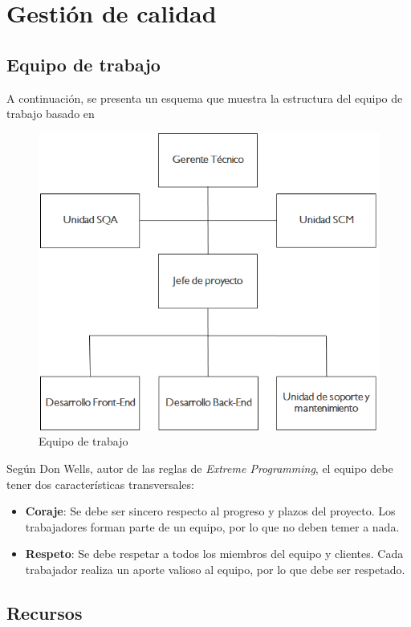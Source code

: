 
\chapter{Gestión de calidad}

\section{Equipo de trabajo}

A continuación, se presenta un esquema que muestra la estructura del equipo de trabajo basado en \citet{web00}\\ 

\begin{figure}[ht!]
\centering
\includegraphics[width=.7\textwidth]{figures/equipo-trabajo.png}
\caption{Equipo de trabajo}
\label{fig:Equipo de trabajo}
\end{figure}

Según Don Wells, autor de las reglas de \textit{Extreme Programming},  el equipo debe tener dos características transversales:

	\begin{itemize}
		\item 
		 \textbf{Coraje}: Se debe ser sincero respecto al progreso y plazos del proyecto. Los trabajadores forman parte de un equipo, por lo que no deben temer a nada.
		\item
		 \textbf{Respeto}: Se debe respetar a todos los miembros del equipo y clientes. Cada trabajador realiza un aporte valioso al equipo, por lo que debe ser respetado.
	\end{itemize}

\section{Recursos}

